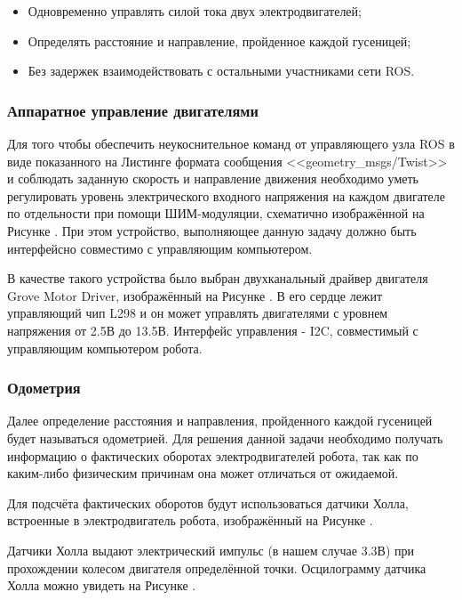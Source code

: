 \documentclass[12pt,a4paper]{scrartcl}
\begin{document}
				\begin{itemize}
					\item Одновременно управлять силой тока двух электродвигателей;
					\item Определять расстояние и направление, пройденное каждой гусеницей;
					\item Без задержек взаимодействовать с остальными участниками сети ROS.
				\end{itemize}
				
				\subsubsection{Аппаратное управление двигателями}
					Для того чтобы обеспечить неукоснительное команд от управляющего узла ROS в виде показанного на Листинге  формата сообщения <<geometry\_msgs/Twist>> и соблюдать заданную скорость и направление движения необходимо уметь регулировать уровень электрического входного напряжения на каждом двигателе по отдельности при помощи ШИМ-модуляции, схематично изображённой на Рисунке . При этом устройство, выполняющее данную задачу должно быть интерфейсно совместимо с управляющим компьютером. 
					
					В качестве такого устройства было выбран двухканальный драйвер двигателя Grove Motor Driver, изображённый на Рисунке . В его сердце лежит управляющий чип L298 и он может управлять двигателями с уровнем напряжения от 2.5В до 13.5В. Интерфейс управления - I2C, совместимый с управляющим компьютером робота.
					
				\subsubsection{Одометрия}
					Далее определение расстояния и направления, пройденного каждой гусеницей будет называться одометрией. Для решения данной задачи необходимо получать информацию о фактических оборотах электродвигателей робота, так как по каким-либо физическим причинам она может отличаться от ожидаемой.
					
					Для подсчёта фактических оборотов будут использоваться датчики Холла, встроенные в электродвигатель робота, изображённый на Рисунке .
					
					Датчики Холла выдают электрический импульс (в нашем случае 3.3В) при прохождении колесом двигателя определённой точки. Осцилограмму датчика Холла можно увидеть на Рисунке . 
					
\end{document}
